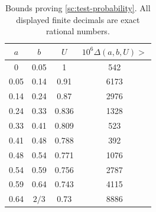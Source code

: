\begin{table}[ht]
\centering
\begin{tabular}{cccc}
\hline
\(a\)&\(b\)&\(U\)&\(10^6\Delta(a,b,U)>\)\\
\hline
0&0.05&1&542\\
0.05&0.14&0.91&6173\\
0.14&0.24&0.87&2976\\
0.24&0.33&0.836&1328\\
0.33&0.41&0.809&523\\
0.41&0.48&0.788&392\\
0.48&0.54&0.771&1076\\
0.54&0.59&0.756&2787\\
0.59&0.64&0.743&4115\\
0.64&\(2/3\)&0.73&8886\\
\hline
\end{tabular}
\caption{Bounds proving \eqref{sc:test-probability}. All displayed
finite decimals are exact rational numbers.}
\label{sc:interval-table}
\end{table}
